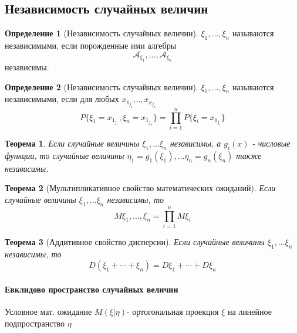 \documentclass[a4paper]{article}
\newtheorem{theorem}{Теорема}[section]
\theoremstyle{definition}
\newtheorem*{definition}{Определение}
\theoremstyle{remark}
\begin{document}
\subsection{Независимость случайных величин}
\begin{definition}[Независимость случайных величин]
    $\xi_1, \dots, \xi_n$ называются независимыми, если порожденные ими алгебры \[\mathcal{A}_{\xi_1}, \dots, \mathcal{A}_{\xi_n}\] независимы.
\end{definition}
\begin{definition}[Независимость случайных величин]
    $\xi_1, \dots, \xi_n$ называются независимыми, если для любых $x_{1_{j_1}}\dots, x_{x_{j_n}}$
    \[P\{\xi_1 = x_{1_{j_1}}, \xi_n = x_{1_{j_n}}\} = \prod_{i = 1}^n P\{\xi_i = x_{1_{j_i}}\}\]
\end{definition}
\begin{theorem}
    Если случайные величины \(\xi_1, \dots \xi_n\) независимы, а \(g_i(x)\) - числовые функции, то случайные величины \(\eta_1 = g_1(\xi_1), \dots \eta_n = g_n(\xi_n) \) также независимы.
\end{theorem}
\begin{theorem}[Мультипликативное свойство математических ожиданий]
    Если случайные величины \(\xi_1, \dots \xi_n\) независимы, то 
    \[M \xi_1, \dots, \xi_n = \prod_{i = 1}^n M \xi_i\]
\end{theorem}
\begin{theorem}[Аддитивное свойство дисперсии]
    Если случайные величины \(\xi_1, \dots \xi_n\) независимы, то 
    \[D(\xi_1 + \cdots + \xi_n) = D\xi_1 + \cdots + D\xi_n\]
\end{theorem}
\paragraph*{Евклидово пространство случайных величин}
Условное мат. ожидание $M (\xi | \eta)$- ортогональная проекция $\xi$ на линейное подпространство $\eta$
\end{document}
